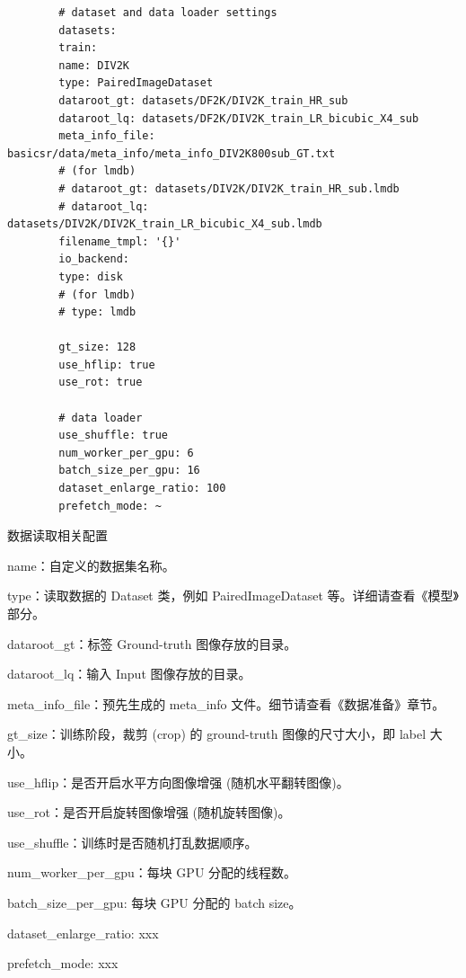 \documentclass[../main.tex]{subfiles}
\begin{document}
	\begin{verbatim}
		# dataset and data loader settings
		datasets:
		train:
		name: DIV2K
		type: PairedImageDataset
		dataroot_gt: datasets/DF2K/DIV2K_train_HR_sub
		dataroot_lq: datasets/DF2K/DIV2K_train_LR_bicubic_X4_sub
		meta_info_file: basicsr/data/meta_info/meta_info_DIV2K800sub_GT.txt
		# (for lmdb)
		# dataroot_gt: datasets/DIV2K/DIV2K_train_HR_sub.lmdb
		# dataroot_lq: datasets/DIV2K/DIV2K_train_LR_bicubic_X4_sub.lmdb
		filename_tmpl: '{}'
		io_backend:
		type: disk
		# (for lmdb)
		# type: lmdb
		
		gt_size: 128
		use_hflip: true
		use_rot: true
		
		# data loader
		use_shuffle: true
		num_worker_per_gpu: 6
		batch_size_per_gpu: 16
		dataset_enlarge_ratio: 100
		prefetch_mode: ~
	\end{verbatim}
	\begin{exampleBox}[righthand ratio=0.00, sidebyside, sidebyside align=center, lower separated=false]{数据读取相关配置}
		
		name：自定义的数据集名称。
		
		type：读取数据的 Dataset 类，例如 PairedImageDataset 等。详细请查看《模型》部分。
		
		dataroot\_gt：标签 Ground-truth 图像存放的目录。
		
		dataroot\_lq：输入 Input 图像存放的目录。
		
		meta\_info\_file：预先生成的 meta\_info 文件。细节请查看《数据准备》章节。
		
		gt\_size：训练阶段，裁剪 (crop) 的 ground-truth 图像的尺寸大小，即 label 大小。
		
		use\_hflip：是否开启水平方向图像增强 (随机水平翻转图像)。
		
		use\_rot：是否开启旋转图像增强 (随机旋转图像)。
		
		use\_shuffle：训练时是否随机打乱数据顺序。
		
		num\_worker\_per\_gpu：每块 GPU 分配的线程数。
		
		batch\_size\_per\_gpu: 每块 GPU 分配的 batch size。
		
		dataset\_enlarge\_ratio: xxx
		
		prefetch\_mode: xxx
		
	\end{exampleBox}
	
\end{document}
